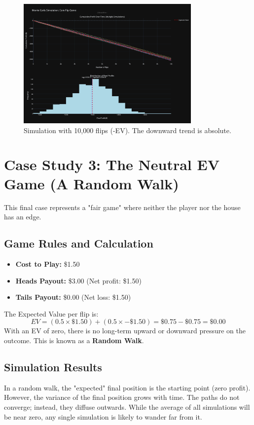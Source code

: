 \documentclass[12pt]{article}
\begin{document}
\begin{figure}[h!]
\centering
\includegraphics[width=0.8\textwidth]{-ev/10k-ev.png}
\caption{Simulation with 10,000 flips (-EV). The downward trend is absolute.}
\end{figure}

\section{Case Study 3: The Neutral EV Game (A Random Walk)}
This final case represents a "fair game" where neither the player nor the house has an edge.

\subsection{Game Rules and Calculation}
\begin{itemize}
    \item \textbf{Cost to Play:} \$1.50
    \item \textbf{Heads Payout:} \$3.00 (Net profit: \$1.50)
    \item \textbf{Tails Payout:} \$0.00 (Net loss: \$1.50)
\end{itemize}
The Expected Value per flip is:
\[
EV = (0.5 \times \$1.50) + (0.5 \times -\$1.50) = \$0.75 - \$0.75 = \boldsymbol{\$0.00}
\]
With an EV of zero, there is no long-term upward or downward pressure on the outcome. This is known as a \textbf{Random Walk}.

\subsection{Simulation Results}
In a random walk, the "expected" final position is the starting point (zero profit). However, the variance of the final position grows with time. The paths do not converge; instead, they diffuse outwards. While the average of all simulations will be near zero, any single simulation is likely to wander far from it.
\end{document}
